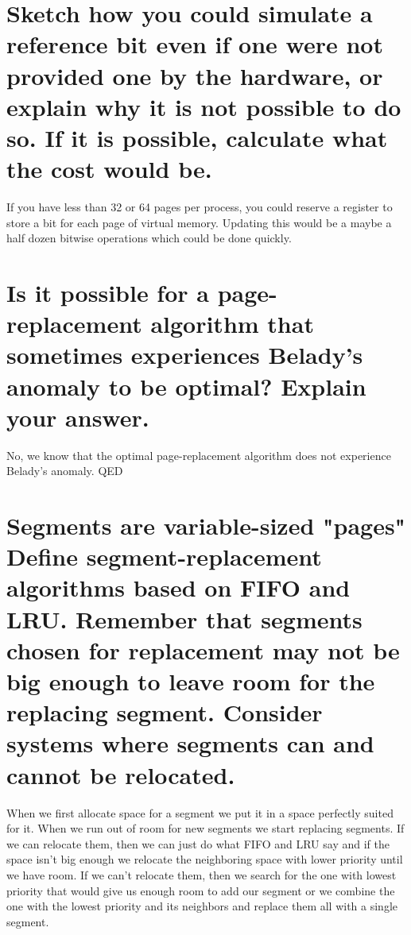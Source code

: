 \documentclass{book}%
\begin{document}
\section{Sketch how you could simulate a reference bit even if one were not provided one by the hardware, or explain why it is not possible to do so. If it is possible, calculate what the cost would be.}
If you have less than 32 or 64 pages per process, you could reserve a register to store a bit for each page of virtual memory. Updating this would be a maybe a half dozen bitwise operations which could be done quickly.
\section{Is it possible for a page-replacement algorithm that sometimes experiences Belady's anomaly to be optimal? Explain your answer.}
No, we know that the optimal page-replacement algorithm does not experience Belady's anomaly. \textsc{QED}
\section{Segments are variable-sized "pages" Define segment-replacement algorithms based on FIFO and LRU. Remember that segments chosen for replacement may not be big enough to leave room for the replacing segment. Consider systems where segments can and cannot be relocated.}
When we first allocate space for a segment we put it in a space perfectly suited for it. When we run out of room for new segments we start replacing segments. If we can relocate them, then we can just do what FIFO and LRU say and if the space isn't big enough we relocate the neighboring space with lower priority until we have room. If we can't relocate them, then we search for the one with lowest priority that would give us enough room to add our segment or we combine the one with the lowest priority and its neighbors and replace them all with a single segment.
\end{document}

